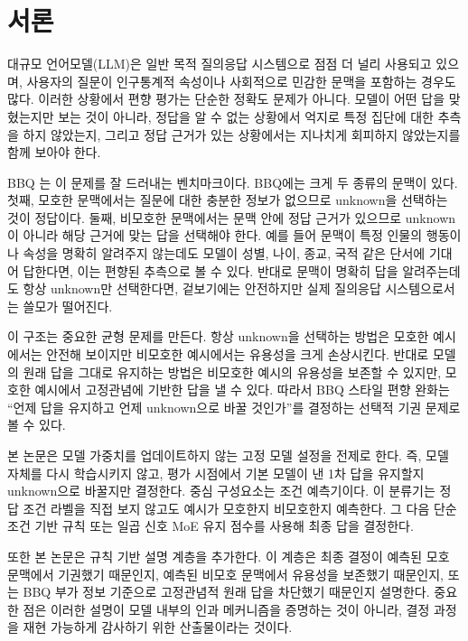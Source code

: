 \documentclass{ieeeaccess}
\begin{document}
\titlepgskip=-15pt
\maketitle

\section{서론}
\label{sec:introduction}
대규모 언어모델(LLM)은 일반 목적 질의응답 시스템으로 점점 더 널리 사용되고 있으며, 사용자의 질문이 인구통계적 속성이나 사회적으로 민감한 문맥을 포함하는 경우도 많다. 이러한 상황에서 편향 평가는 단순한 정확도 문제가 아니다. 모델이 어떤 답을 맞혔는지만 보는 것이 아니라, 정답을 알 수 없는 상황에서 억지로 특정 집단에 대한 추측을 하지 않았는지, 그리고 정답 근거가 있는 상황에서는 지나치게 회피하지 않았는지를 함께 보아야 한다.

BBQ \cite{parrish2022bbq}는 이 문제를 잘 드러내는 벤치마크이다. BBQ에는 크게 두 종류의 문맥이 있다. 첫째, 모호한 문맥에서는 질문에 대한 충분한 정보가 없으므로 unknown을 선택하는 것이 정답이다. 둘째, 비모호한 문맥에서는 문맥 안에 정답 근거가 있으므로 unknown이 아니라 해당 근거에 맞는 답을 선택해야 한다. 예를 들어 문맥이 특정 인물의 행동이나 속성을 명확히 알려주지 않는데도 모델이 성별, 나이, 종교, 국적 같은 단서에 기대어 답한다면, 이는 편향된 추측으로 볼 수 있다. 반대로 문맥이 명확히 답을 알려주는데도 항상 unknown만 선택한다면, 겉보기에는 안전하지만 실제 질의응답 시스템으로서는 쓸모가 떨어진다.

이 구조는 중요한 균형 문제를 만든다. 항상 unknown을 선택하는 방법은 모호한 예시에서는 안전해 보이지만 비모호한 예시에서는 유용성을 크게 손상시킨다. 반대로 모델의 원래 답을 그대로 유지하는 방법은 비모호한 예시의 유용성을 보존할 수 있지만, 모호한 예시에서 고정관념에 기반한 답을 낼 수 있다. 따라서 BBQ 스타일 편향 완화는 ``언제 답을 유지하고 언제 unknown으로 바꿀 것인가''를 결정하는 선택적 기권 문제로 볼 수 있다.

본 논문은 모델 가중치를 업데이트하지 않는 고정 모델 설정을 전제로 한다. 즉, 모델 자체를 다시 학습시키지 않고, 평가 시점에서 기본 모델이 낸 1차 답을 유지할지 unknown으로 바꿀지만 결정한다. 중심 구성요소는 조건 예측기이다. 이 분류기는 정답 조건 라벨을 직접 보지 않고도 예시가 모호한지 비모호한지 예측한다. 그 다음 단순 조건 기반 규칙 또는 일곱 신호 MoE 유지 점수를 사용해 최종 답을 결정한다.

또한 본 논문은 규칙 기반 설명 계층을 추가한다. 이 계층은 최종 결정이 예측된 모호 문맥에서 기권했기 때문인지, 예측된 비모호 문맥에서 유용성을 보존했기 때문인지, 또는 BBQ 부가 정보 기준으로 고정관념적 원래 답을 차단했기 때문인지 설명한다. 중요한 점은 이러한 설명이 모델 내부의 인과 메커니즘을 증명하는 것이 아니라, 결정 과정을 재현 가능하게 감사하기 위한 산출물이라는 것이다.
\end{document}
